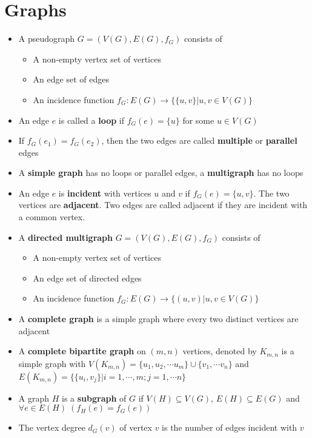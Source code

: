 \documentclass[11pt, twocolumn]{article}
\newenvironment{compactitem}
{\begin{itemize}
  \setlength{\itemsep}{1px}
  \setlength{\parskip}{0pt}
  \setlength{\parsep}{0pt}}
{\end{itemize}}
\begin{document}
\section{Graphs}
\begin{compactitem}
\item A pseudograph $G = (V(G), E(G), f_G)$ consists of 
\begin{compactitem}
\item A non-empty vertex set of vertices
\item An edge set of edges
\item An incidence function $f_G: E(G) \rightarrow \{\{u, v\}|u, v\in V(G)\}$
\end{compactitem}
\item An edge $e$ is called a \textbf{loop} if $f_G(e) = \{u\}$ for some $u\in V(G)$
\item If $f_G(e_1) = f_G(e_2)$, then the two edges are called \textbf{multiple} or \textbf{parallel} edges
\item A \textbf{simple graph} has no loops or parallel edges, a \textbf{multigraph} has no loops
\item An edge $e$ is \textbf{incident} with vertices $u$ and $v$ if $f_G(e) = \{ u, v \}$. The two vertices are \textbf{adjacent}. Two edges are called adjacent if they are incident with a common vertex.
\item A \textbf{directed multigraph} $G = (V(G), E(G), f_G)$ consists of 
\begin{compactitem}
\item A non-empty vertex set of vertices
\item An edge set of directed edges
\item An incidence function $f_G: E(G) \rightarrow \{(u, v)|u, v\in V(G)\}$
\end{compactitem}
\item A \textbf{complete graph} is a simple graph where every two distinct vertices are adjacent
\item A \textbf{complete bipartite graph} on $(m, n)$ vertices, denoted by $K_{m,n}$ is a simple graph with $V(K_{m, n}) = \{u_1, u_2, \cdots u_m\} \cup \{v_1, \cdots v_n\}$ and $E(K_{m, n}) = \{\{u_i, v_j\}|i=1, \cdots, m; j = 1, \cdots n\}$
\item A graph $H$ is a \textbf{subgraph} of $G$ if $V(H)\subseteq V(G)$, $E(H) \subseteq E(G)$ and $\forall e\in E(H)\; (f_H(e) = f_G(e))$
\item The vertex degree $d_G(v)$ of vertex $v$ is the number of edges incident with $v$

\end{compactitem}
\end{document}
